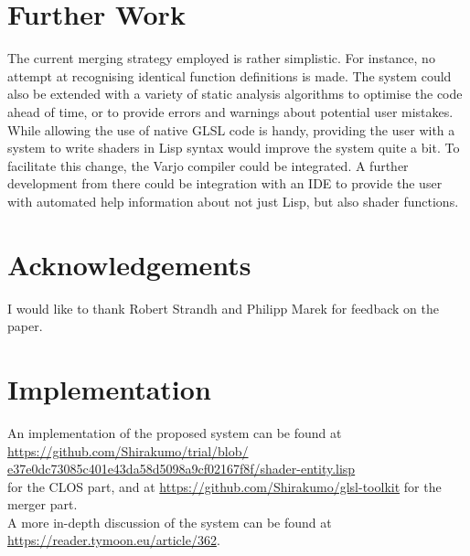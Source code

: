 \documentclass[format=sigconf]{acmart}
\begin{document}
\section{Further Work}\label{section:7}
The current merging strategy employed is rather simplistic. For instance, no attempt at recognising identical function definitions is made. The system could also be extended with a variety of static analysis algorithms to optimise the code ahead of time, or to provide errors and warnings about potential user mistakes. \\

While allowing the use of native GLSL code is handy, providing the user with a system to write shaders in Lisp syntax would improve the system quite a bit. To facilitate this change, the Varjo\cite{varjo} compiler could be integrated. A further development from there could be integration with an IDE to provide the user with automated help information about not just Lisp, but also shader functions.

\section{Acknowledgements}\label{section:8}
I would like to thank Robert Strandh and Philipp Marek for feedback on the paper.

\section{Implementation}\label{section:9}
An implementation of the proposed system can be found at \\\href{https://github.com/Shirakumo/trial/blob/e37e0dc73085c401e43da58d5098a9cf02167f8f/shader-entity.lisp}{https://github.com/Shirakumo/trial/blob/\\e37e0dc73085c401e43da58d5098a9cf02167f8f/shader-entity.lisp} \\ for the CLOS part, and at \url{https://github.com/Shirakumo/glsl-toolkit} for the merger part. \\

A more in-depth discussion of the system can be found at \\\url{https://reader.tymoon.eu/article/362}.


\end{document}
